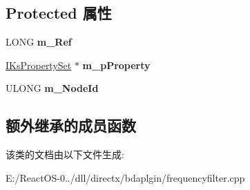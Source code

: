 \subsection*{Protected 属性}
\begin{DoxyCompactItemize}
\item 
\mbox{\label{class_c_b_d_a_frequency_filter_a543c18b1b82b694608c97f8629d312d8}} 
L\+O\+NG {\bfseries m\+\_\+\+Ref}
\item 
\mbox{\label{class_c_b_d_a_frequency_filter_a9813c039aa8f879b4aafbc3eb80fdb22}} 
\hyperlink{interface_i_ks_property_set}{I\+Ks\+Property\+Set} $\ast$ {\bfseries m\+\_\+p\+Property}
\item 
\mbox{\label{class_c_b_d_a_frequency_filter_a67fa91448c02f024dd1d2260a0994e5d}} 
U\+L\+O\+NG {\bfseries m\+\_\+\+Node\+Id}
\end{DoxyCompactItemize}
\subsection*{额外继承的成员函数}


该类的文档由以下文件生成\+:\begin{DoxyCompactItemize}
\item 
E\+:/\+React\+O\+S-\/0../dll/directx/bdaplgin/frequencyfilter.\+cpp\end{DoxyCompactItemize}
